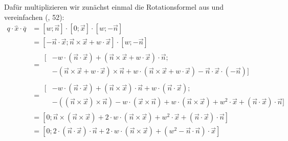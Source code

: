 Dafür multiplizieren wir zunächst einmal die Rotationsformel aus und vereinfachen (\vgl \citep{quaternionrotation}, 52):
\begin{equation}
\begin{split}
 q \cdot \hat{x} \cdot \overline{q} &= \left[ w; \vec n \right] \cdot \left[ 0; \vec x \right] \cdot \left[ w; -\vec n \right] \\
 &= \left[ - \vec n \cdot \vec x; \vec n \times \vec x + w \cdot \vec x \right] \cdot \left[ w; -\vec n \right] \\
 &= \begin{split}[ &- w \cdot ( \vec n \cdot \vec x ) + ( \vec n \times \vec x + w \cdot \vec x ) \cdot \vec n; \\
  &- ( \vec n \times \vec x + w \cdot \vec x ) \times \vec n + w \cdot ( \vec n \times \vec x + w \cdot \vec x ) - \vec n \cdot \vec x \cdot ( - \vec n ) ] \end{split} \\
 &= \begin{split}[ &- w \cdot ( \vec n \cdot \vec x ) + ( \vec n \times \vec x ) \cdot \vec n + w \cdot ( \vec n \cdot \vec x ); \\
  &- ( ( \vec n \times \vec x ) \times \vec n ) - w \cdot ( \vec x \times \vec n ) + w \cdot ( \vec n \times \vec x ) + w^2 \cdot \vec x + ( \vec n \cdot \vec x ) \cdot \vec n ] \end{split} \\
 &= \left[ 0; \vec n \times ( \vec n \times \vec x ) + 2 \cdot w \cdot ( \vec n \times \vec x ) + w^2 \cdot \vec x + ( \vec n \cdot \vec x ) \cdot \vec n \right] \\
 &= \left[ 0; 2 \cdot ( \vec n \cdot \vec x ) \cdot \vec n + 2 \cdot w \cdot ( \vec n \times \vec x ) + ( w^2 - \vec n \cdot \vec n ) \cdot \vec x \right]
\end{split}
\end{equation}

